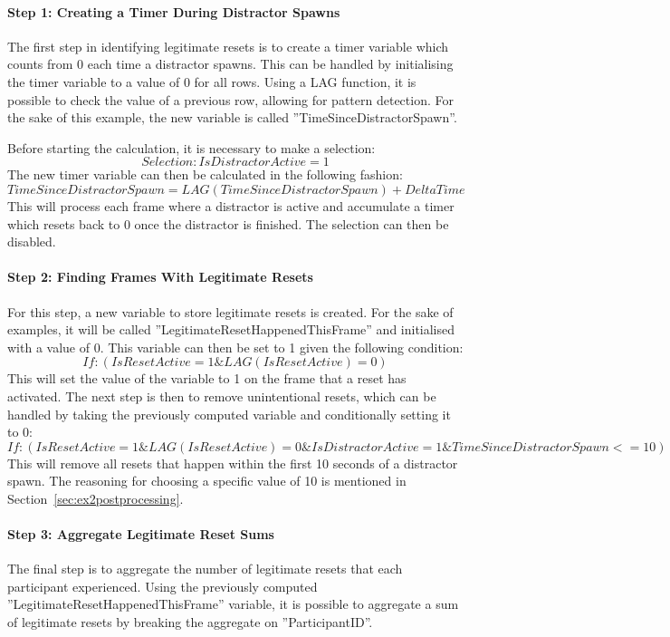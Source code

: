 \paragraph{Step 1: Creating a Timer During Distractor Spawns}
The first step in identifying legitimate resets is to create a timer variable which counts from 0 each time a distractor spawns. This can be handled by initialising the timer variable to a value of 0 for all rows. Using a LAG function, it is possible to check the value of a previous row, allowing for pattern detection. For the sake of this example, the new variable is called ''TimeSinceDistractorSpawn''. 

Before starting the calculation, it is necessary to make a selection:
$$
Selection: IsDistractorActive = 1
$$
The new timer variable can then be calculated in the following fashion:
$$
TimeSinceDistractorSpawn = LAG(TimeSinceDistractorSpawn) + DeltaTime
$$
This will process each frame where a distractor is active and accumulate a timer which resets back to 0 once the distractor is finished. The selection can then be disabled.  

\paragraph{Step 2: Finding Frames With Legitimate Resets}
For this step, a new variable to store legitimate resets is created. For the sake of examples, it will be called ''LegitimateResetHappenedThisFrame'' and initialised with a value of 0. This variable can then be set to 1 given the following condition:
$$
If: (IsResetActive = 1 \& LAG(IsResetActive) = 0)
$$
This will set the value of the variable to 1 on the frame that a reset has activated. The next step is then to remove unintentional resets, which can be handled by taking the previously computed variable and conditionally setting it to 0:
$$
If: (IsResetActive = 1 \& LAG(IsResetActive) = 0 \& IsDistractorActive = 1 \& TimeSinceDistractorSpawn <= 10)
$$
This will remove all resets that happen within the first 10 seconds of a distractor spawn. The reasoning for choosing a specific value of 10 is mentioned in Section~\ref{sec:ex2postprocessing}.

\paragraph{Step 3: Aggregate Legitimate Reset Sums}
The final step is to aggregate the number of legitimate resets that each participant experienced. Using the previously computed ''LegitimateResetHappenedThisFrame'' variable, it is possible to aggregate a sum of legitimate resets by breaking the aggregate on ''ParticipantID''. 

